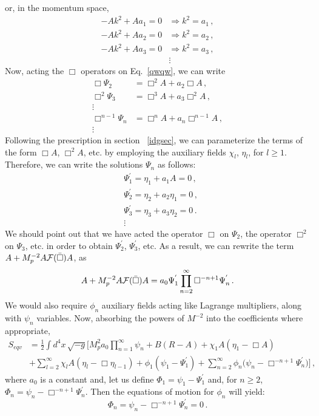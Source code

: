 \documentclass[a4paper,12pt]{article}
\newcommand{\bbox}{\bar{\Box}}
\newcommand{\be}{\begin{equation}}
\newcommand{\ee}{\end{equation}}
\newcommand{\cF}{{\cal F}}
\newcommand{\+}{^{\dagger}}
\newcommand{\Ra}{\Rightarrow}
\newcommand{\2}{\frac{1}{2}}
\newcommand{\3}{\frac{1}{3}}
\newcommand{\4}{\frac{1}{4}}
\newcommand{\6}{\frac{1}{6}}
\newcommand{\8}{\frac{1}{8}}
\newcommand{\non}{\nonumber\\}
\begin{document}
or, in the momentum space,
\begin{align}
-A k^{2}+Aa_1 =0 & \Ra k^{2}=a_{1} \,,\nonumber\\
-Ak^{2}+Aa_2 =0 & \Ra k^{2}=a_{2} \,,\nonumber\\
-Ak^{2} +Aa_3=0 & \Ra k^{2}=a_{3} \,,\nonumber\\
&\vdots
\end{align}
Now, acting the $\Box$ operators on Eq.~\eqref{qwqw}, we can write
\begin{align}
\Box \Psi_{2}&=\Box^{2}A+a_{2}\Box A \,, \non
\Box^{2} \Psi_{3}&=\Box^{3}A+a_{3}\Box^{2} A \,, \non
\vdots \non
\Box^{n-1} \Psi_{n}&=\Box^{n}A+a_{n}\Box^{n-1} A \,, \non
\vdots
\end{align}
Following the prescription in section ~\ref{idgsec}, we can parameterize the terms of the form $\Box A$, $\Box^{2}A$, etc. by employing the auxiliary fields $\chi_l$,  $\eta_{l}$, for $l \geq 1$. 
Therefore, we can write the solutions $\Psi_n$ as follows:
\begin{align}
&\Psi_{1}^{'}=\eta_{1}+a_1 A=0\,,\nonumber\\
&\Psi_{2}^{'}=\eta_{2}+a_2 \eta_{1}=0  \,,\nonumber\\
&\Psi_{3}^{'}=\eta_{3} +a_{3}\eta_{2}=0  \,.\nonumber\\
&\vdots
\end{align}
We should point out that we have acted the operator $\Box$ on $\Psi_{2}$, the operator $\Box^2$ on $\Psi_3$, etc. in order to obtain $\Psi_{2}^{'}$, $\Psi_{3}^{'}$, etc. As a result, we can rewrite the term $A+M_{p}^{-2}A \cF(\bbox) A$, as
\be
A+M_{p}^{-2}A \cF(\bbox)A=a_{0}\Psi_{1}^{'}\prod_{n=2}^{\infty}\Box^{-n+1}\Psi_{n}^{'} \,.
\ee
We would also require $\phi_n$ auxiliary fields acting like Lagrange multipliers, along with $\psi_{n}$ variables. Now, absorbing the powers of $M^{-2}$ into the coefficients where appropriate, 
\begin{align}
S_{eqv}&=\frac{1}{2}\int d^{4} x \, \sqrt{-g}\bigg[M^{2}_{p}a_{0}\prod_{n=1}^{\infty}\psi_{n}+B(R-A)+\chi_{1}A(\eta_{1}-\Box A)\non
&+\sum
^{\infty}_{l=2}\chi_lA(\eta_l-\Box \eta_{l-1})+\phi_{1}(\psi_{1}-\Psi_{1}^{'})+\sum^{\infty}_{n=2}\phi_n\big(\psi_n-\Box^{-n+1}\Psi_{n}^{'}\big)\bigg]\,,
\end{align}
where  $a_0$ is a constant and, let us define $\Phi_{1}=\psi_{1}-\Psi_{1}^{'}$ and, for $n \geq 2$, $\Phi_n=\psi_n-\Box^{-n+1}\Psi_n^{'}$. 
Then the equations of motion for $\phi_n$ will yield:
\begin{equation}\label{molo}
\Phi_n=\psi_n-\Box^{-n+1}\Psi_n^{'}=0\,.
\end{equation}
\end{document}

